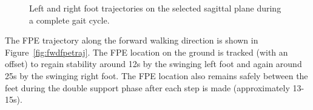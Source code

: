 \begin{figure}[!h]
	\begin{center}
	\end{center}
  	\caption{Left and right foot trajectories on the selected sagittal plane during a complete gait cycle.}
	\label{fig:fwdfoottraj}
\end{figure}

The FPE trajectory along the forward walking direction is shown in Figure~\ref{fig:fwdfpetraj}. The FPE location on the ground is tracked (with an offset) to regain stability around 12s by the swinging left foot and again around 25s by the swinging right foot. The FPE location also remains safely between the feet during the double support phase after each step is made (approximately 13-15s). 


